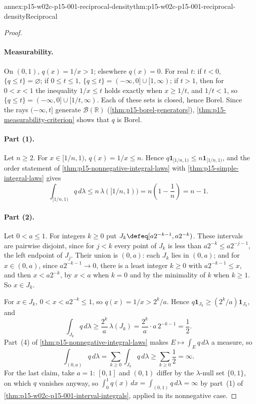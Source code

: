\begin{annexitem}{annex:p15-w02c-p15-001-reciprocal-density}{thm:p15-w02c-p15-001-reciprocal-density}{Reciprocal}
\begin{proof}
\paragraph{Measurability.}
On \((0,1)\), \(q(x)=1/x>1\); elsewhere \(q(x)=0\). For real \(t\):
if \(t<0\), \(\{q\leq t\}=\varnothing\); if \(0\leq t\leq1\),
\(\{q\leq t\}=(-\infty,0]\cup[1,\infty)\); if \(t>1\), then for
\(0<x<1\) the inequality \(1/x\leq t\) holds exactly when \(x\geq1/t\),
and \(1/t<1\), so \(\{q\leq t\}=(-\infty,0]\cup[1/t,\infty)\). Each of
these sets is closed, hence Borel. Since the rays \((-\infty,t]\) generate
\(\mathcal B(\mathbb R)\) (\cref{thm:p15-borel-generators}),
\cref{thm:p15-measurability-criterion} shows that \(q\) is Borel.

\paragraph{Part (1).}
Let \(n\geq2\). For \(x\in[1/n,1)\), \(q(x)=1/x\leq n\). Hence
\(q\mathbf1_{[1/n,1)}\leq n\mathbf1_{[1/n,1)}\), and the order statement
of \cref{thm:p15-nonnegative-integral-laws} with
\cref{thm:p15-simple-integral-laws} gives
\[
 \int_{[1/n,1)}q\,d\lambda\leq n\,\lambda([1/n,1))=n\left(1-\frac1n\right)=n-1 .
\]

\paragraph{Part (2).}
Let \(0<a\leq1\). For integers \(k\geq0\) put
\(J_k\defeq[a2^{-k-1},a2^{-k})\). These intervals are pairwise disjoint,
since for \(j<k\) every point of \(J_k\) is less than
\(a2^{-k}\leq a2^{-j-1}\), the left endpoint of \(J_j\). Their union is
\((0,a)\): each \(J_k\) lies in \((0,a)\); and for \(x\in(0,a)\), since
\(a2^{-k-1}\to0\), there is a least integer \(k\geq0\) with
\(a2^{-k-1}\leq x\), and then \(x<a2^{-k}\), by \(x<a\) when \(k=0\) and
by the minimality of \(k\) when \(k\geq1\). So \(x\in J_k\).

For \(x\in J_k\), \(0<x<a2^{-k}\leq1\), so \(q(x)=1/x>2^k/a\). Hence
\(q\mathbf1_{J_k}\geq(2^k/a)\mathbf1_{J_k}\), and
\[
 \int_{J_k}q\,d\lambda\geq\frac{2^k}a\,\lambda(J_k)
 =\frac{2^k}a\cdot a\,2^{-k-1}=\frac12 .
\]
Part~(4) of \cref{thm:p15-nonnegative-integral-laws} makes
\(E\mapsto\int_Eq\,d\lambda\) a measure, so
\[
 \int_{(0,a)}q\,d\lambda=\sum_{k\geq0}\int_{J_k}q\,d\lambda
 \geq\sum_{k\geq0}\frac12=\infty .
\]
For the last claim, take \(a=1\): \([0,1]\) and \((0,1)\) differ by the
\(\lambda\)-null set \(\{0,1\}\), on which \(q\) vanishes anyway, so
\(\int_0^1q(x)\,dx=\int_{(0,1)}q\,d\lambda=\infty\) by part~(1) of
\cref{thm:p15-w02c-p15-001-interval-integrals}, applied in its
nonnegative case.
\end{proof}
\end{annexitem}

